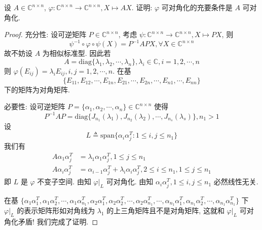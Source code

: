 \documentclass[../../main.tex]{subfiles}
\begin{document}
\begin{example}
设 $A \in \mathbb{C}^{n \times n}$, $\varphi : \mathbb{C}^{n \times n} \to \mathbb{C}^{n \times n}, X \mapsto AX$. 证明: $\varphi$ 可对角化的充要条件是 $A$ 可对角化.
\end{example}
\begin{proof}
{\heiti 充分性:}
设可逆矩阵 $P \in \mathbb{C}^{n \times n}$, 考虑 $\psi : \mathbb{C}^{n \times n} \to \mathbb{C}^{n \times n}, X \mapsto PX$, 则
$$\psi^{-1} \circ \varphi \circ \psi (X) = P^{-1}APX, \forall X \in \mathbb{C}^{n \times n}$$
故不妨设 $A$ 为相似标准型. 因此若
$$A = \mathrm{diag}\{\lambda_1, \lambda_2, \cdots, \lambda_n\}, \lambda_i \in \mathbb{C}, i = 1, 2, \cdots, n$$
则 $\varphi(E_{ij}) = \lambda_i E_{ij}, i, j = 1, 2, \cdots, n$. 在基
$$\{E_{11}, E_{12}, \cdots, E_{1n}, E_{21}, \cdots, E_{2n}, \cdots, E_{n1}, \cdots, E_{nn}\}$$
下的矩阵为对角矩阵.

{\heiti 必要性:}
设可逆矩阵 $P = \{\alpha_1, \alpha_2, \cdots, \alpha_n\} \in \mathbb{C}^{n \times n}$ 使得
$$P^{-1}AP = \mathrm{diag}\{J_{n_1}(\lambda_1), J_{n_2}(\lambda_2), \cdots, J_{n_s}(\lambda_s)\}, n_1 > 1$$
设
$$L \triangleq \mathrm{span}\{\alpha_i \alpha_j^T : 1 \leqslant  i, j \leqslant  n_1\}$$
我们有
\begin{align*}
A\alpha_1 \alpha_j^T &= \lambda_1 \alpha_1 \alpha_j^T, 1 \leqslant  j \leqslant  n_1 \\
A\alpha_i \alpha_j^T &= \alpha_{i - 1} \alpha_j^T + \lambda_i \alpha_i \alpha_j^T, 2 \leqslant  i \leqslant  n_1, 1 \leqslant  j \leqslant  n_1
\end{align*}
即 $L$ 是 $\varphi$ 不变子空间. 由知 $\varphi|_L$ 可对角化. 由知 $\alpha_i \alpha_j^T, 1 \leqslant  i, j \leqslant  n_1$ 必然线性无关.

在基 $\{\alpha_1 \alpha_1^T, \alpha_1 \alpha_2^T, \cdots, \alpha_1 \alpha_{n_1}^T, \alpha_2 \alpha_1^T, \alpha_2 \alpha_2^T, \cdots, \alpha_2 \alpha_{n_1}^T, \cdots, \alpha_{n_1} \alpha_1^T, \alpha_{n_1} \alpha_2^T, \cdots, \alpha_{n_1} \alpha_{n_1}^T\}$ 下 $\varphi|_L$ 的表示矩阵形如对角线为 $\lambda_1$ 的上三角矩阵且不是对角矩阵, 这就和 $\varphi|_L$ 可对角化矛盾! 我们完成了证明.

\end{proof}
\end{document}
